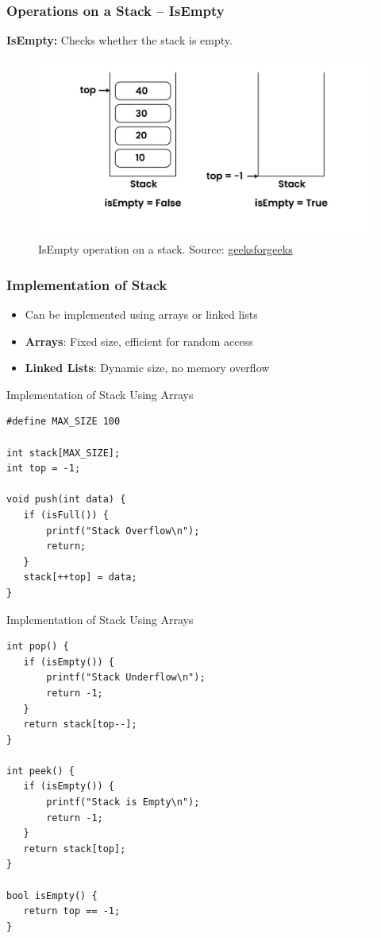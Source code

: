 \documentclass[10pt]{beamer}
\begin{document}
\begin{frame}\frametitle{Operations on a Stack – IsEmpty}
    \textbf{IsEmpty:} Checks whether the stack is empty.
        \begin{figure}[h]
        \centering
        \includegraphics[width=1\textwidth]{img/isEmpty.png}
        \caption{IsEmpty operation on a stack. Source: \href{https://www.geeksforgeeks.org/introduction-to-stack-data-structure-and-algorithm-tutorials/}{geeksforgeeks}}
    \end{figure}
\end{frame}

\begin{frame}\frametitle{Implementation of Stack}
    \begin{itemize}
        \item Can be implemented using arrays or linked lists
        \item \textbf{Arrays}: Fixed size, efficient for random access
        \item \textbf{Linked Lists}: Dynamic size, no memory overflow
    \end{itemize}
\end{frame}

\begin{frame}[fragile]{Implementation of Stack Using Arrays}
\begin{lstlisting}
#define MAX_SIZE 100 

int stack[MAX_SIZE];
int top = -1;

void push(int data) {
   if (isFull()) {
       printf("Stack Overflow\n");
       return;
   }
   stack[++top] = data;
}
\end{lstlisting}
\end{frame}

\begin{frame}[fragile]{Implementation of Stack Using Arrays}
\begin{lstlisting}
int pop() {
   if (isEmpty()) {
       printf("Stack Underflow\n");
       return -1;
   }
   return stack[top--]; 
}

int peek() {
   if (isEmpty()) {
       printf("Stack is Empty\n");
       return -1;
   }
   return stack[top];
}

bool isEmpty() {
   return top == -1;
}
\end{lstlisting}
\end{frame}
\end{document}
